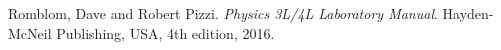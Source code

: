 \documentclass[journal, a4paper]{IEEEtran}
\begin{document}
\begin{thebibliography}{1}

	Romblom, Dave and Robert Pizzi. {\em Physics 3L/4L Laboratory Manual}. Hayden-McNeil Publishing, USA, 4th edition, 2016.

\end{thebibliography}

\end{document}
